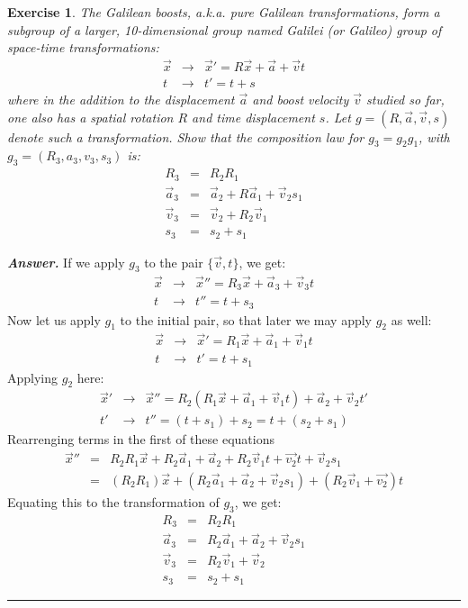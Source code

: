 \documentclass[12pt]{article}
\def\bea{\begin{eqnarray*}}
\def\eea{\end{eqnarray*}}
\newtheorem{exercise}{Exercise}
\newenvironment{answer}{\noindent\textbf{\textit{Answer.}} \normalfont }{\par\noindent\rule{\textwidth}{0.4pt}}
\begin{document}
	\begin{exercise}
		The Galilean boosts, a.k.a. pure Galilean transformations, form a
		subgroup of a larger, 10-dimensional group named Galilei (or Galileo) group of space-time transformations:
		\bea
			\vec{x} &\to& \vec{x}'=R\vec{x} + \vec{a} + \vec{v}t \\
			t &\to& t' = t + s
		\eea
		where in the addition to the displacement $\vec{a}$ and boost velocity	 $\vec{v}$ studied so far, one also has a spatial rotation $R$ and time displacement $s$. Let $g = (R,  \vec{a}, \vec{v} , s)$ denote such a transformation. Show that the composition law for $g_3 = g_2g_1$, with $g_3 = (R_3 , a_3 , v_3 , s_3)$ is:
		\bea
			R_3 &=& R_2R_1 \\
			\vec{a}_3 &=& \vec{a}_2 + R\vec{a}_1 + \vec{v}_2s_1 \\
			\vec{v}_3 &=& \vec{v}_2 + R_2\vec{v}_1 \\
			s_3 &=& s_2 + s_1
		\eea
	\end{exercise}
	\begin{answer}
		If we apply $g_3$ to the pair $\{\vec{v}, t\}$, we get:
		\bea
			\vec{x} &\to& \vec{x}''=R_3\vec{x} + \vec{a}_3 + \vec{v}_3t \\
			t &\to& t'' = t + s_3
		\eea
		Now let us apply $g_1$ to the initial pair, so that later we may apply $g_2$ as well:
		\bea
			\vec{x} &\to& \vec{x}'= R_1\vec{x} + \vec{a}_1 + \vec{v}_1t \\
			t &\to& t' = t + s_1
		\eea
		Applying $g_2$ here:
		\bea
			\vec{x}' &\to& \vec{x}'' = R_2(R_1\vec{x} + \vec{a}_1 + \vec{v}_1t) + \vec{a}_2 + \vec{v}_2t' \\
			t' &\to& t'' = (t + s_1) + s_2 = t + (s_2 + s_1)
		\eea
		Rearrenging terms in the first of these equations
		\bea
			\vec{x}'' &=& R_2R_1\vec{x} + R_2\vec{a}_1 +\vec{a}_2 + R_2\vec{v}_1t + \vec{v_2}t + \vec{v}_2s_1 \\
				&=& (R_2R_1)\vec{x} + (R_2\vec{a}_1 +\vec{a}_2 + \vec{v}_2s_1) + (R_2\vec{v}_1 + \vec{v_2})t
		\eea
		Equating this to the transformation of $g_3$, we get:
		\bea
			R_3 &=& R_2R_1 \\
			\vec{a}_3 &=& R_2\vec{a}_1 + \vec{a}_2 + \vec{v}_2s_1 \\
			\vec{v}_3 &=& R_2\vec{v}_1 + \vec{v}_2 \\
			s_3 &=& s_2 + s_1
		\eea		
	\end{answer}
	
\end{document}

